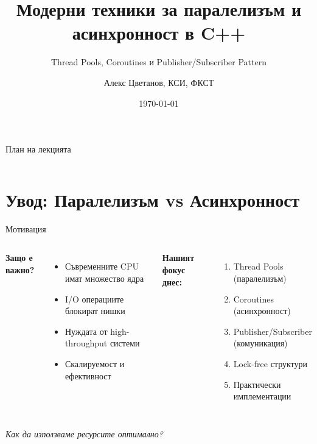 \documentclass[aspectratio=169]{beamer}
\title{Модерни техники за паралелизъм и асинхронност в C++}
\subtitle{Thread Pools, Coroutines и Publisher/Subscriber Pattern}
\author{Алекс Цветанов, КСИ, ФКСТ}
\institute{Паралелно програмиране}
\date{\today}
\begin{document}
\begin{frame}
\titlepage
\end{frame}

\begin{frame}{План на лекцията}
\begin{columns}[t]
\tableofcontents[sections={1-3}]

\tableofcontents[sections={4-6}]
\end{columns}
\end{frame}

\section{Увод: Паралелизъм vs Асинхронност}

\begin{frame}{Мотивация}
\begin{columns}
\textbf{Защо е важно?}
\begin{itemize}
    \item Съвременните CPU имат множество ядра
    \item I/O операциите блокират нишки
    \item Нуждата от high-throughput системи
    \item Скалируемост и ефективност
\end{itemize}

\textbf{Нашият фокус днес:}
\begin{enumerate}
    \item Thread Pools (паралелизъм)
    \item Coroutines (асинхронност)
    \item Publisher/Subscriber (комуникация)
    \item Lock-free структури
    \item Практически имплементации
\end{enumerate}
\end{columns}

\vspace{0.5cm}
\centering
\textit{Как да използваме ресурсите оптимално?}
\end{frame}
\end{document}
